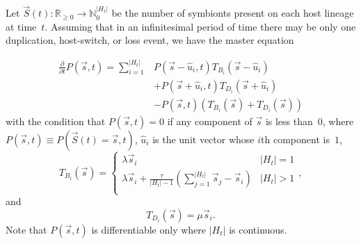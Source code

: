 \documentclass{article}
\begin{document}
            Let $\vec{S}\left(t\right) : \mathbb{R}_{\geq 0} \to
            \mathbb{N}_{0}^{\lvert{H_t}\rvert}$ be the number of symbionts
            present on each host lineage at time~$t$. Assuming that in an
            infinitesimal period of time there may be only one duplication,
            host-switch, or loss event, we have the master equation

            \begin{equation}
                \begin{split}
                    \frac{\partial}{\partial t} P\left(\vec{s},t\right) =
                    \sum_{i=1}^{\lvert{H_t}\rvert}
                    &P\left(\vec{s} - \hat{u}_i, t\right)T_{B_i}\left(\vec{s} -
                    \hat{u}_i\right) \\ &+ P\left(\vec{s} + \hat{u}_i,
                    t\right)T_{D_i}\left(\vec{s} + \hat{u}_i \right) \\ &-
                    P\left(\vec{s}, t\right)\left(T_{B_i}\left(\vec{s}\right) +
                    T_{D_i}\left(\vec{s} \right)\right)
                \end{split}
            \end{equation}
            with the condition that $P\left(\vec{s},t\right) = 0$ if any
            component of $\vec{s}$ is less than~$0$, where $P\left(\vec{s},
            t\right) \equiv P\left(\vec{S}\left(t\right)
            = \vec{s}, t\right)$, $\hat{u}_i$ is the unit vector whose $i$th
            component is~$1$,
            \begin{equation}
                T_{B_i}\left(\vec{s}\right) =
                \begin{cases}
                    \lambda \vec{s}_i & \lvert{H_t}\rvert = 1 \\
                    \lambda \vec{s}_i +
                    \frac{\tau}{\lvert{H_t}\rvert - 1}
                    \left(\sum_{j=1}^{\lvert{H_t}\rvert}
                    {\vec{s}_j}-\vec{s}_i\right) & \lvert{H_t}\rvert > 1 \\
                \end{cases},
            \end{equation}
            and
            \begin{equation}
                T_{D_i}\left(\vec{s}\right) = \mu \vec{s}_i.
            \end{equation}
            Note that $P\left(\vec{s},t\right)$ is differentiable only where
            $\lvert{H_t}\rvert$ is continuous.
\end{document}
